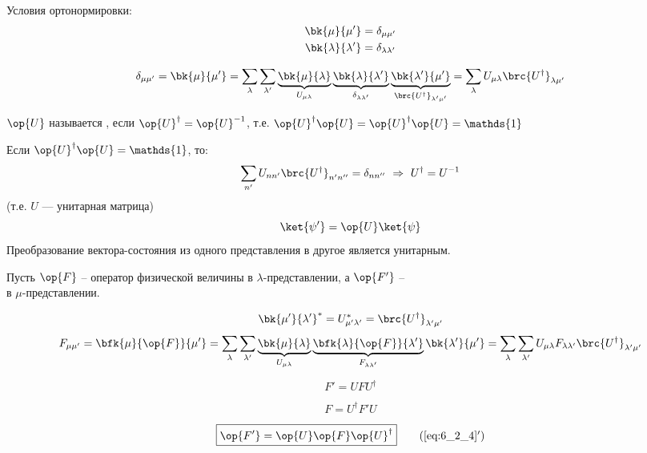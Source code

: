 Условия ортонормировки:
$$
\begin{gathered}
\bk{\mu}{\mu'}=\delta_{\mu\mu'}\\
\bk{\lambda}{\lambda'}=\delta_{\lambda\lambda'}
\end{gathered}
$$

$$
\delta_{\mu\mu'} = 
\bk{\mu}{\mu'} =
\sum_\lambda \sum_{\lambda'} \underbrace{\bk{\mu}{\lambda}}_{U_{\mu\lambda}}
\underbrace{\bk{\lambda}{\lambda'}}_{\delta_{\lambda\lambda'}}
\underbrace{\bk{\lambda'}{\mu'}}_{\brc{U^\dag}_{\lambda'\mu'}} =
\sum_\lambda U_{\mu\lambda}\brc{U^\dag}_{\lambda\mu'}
$$

\begin{defn}
$\op{U}$ называется , если $\op{U}^\dag = \op{U}^{-1}$, т.е. $\op{U}^\dag\op{U}=\op{U}^\dag\op{U}=\mathds{1}$
\end{defn}

Если $\op{U}^\dag\op{U}=\mathds{1}$, то:
$$
\sum_{n'}U_{nn'} \brc{U^\dag}_{n'n''}=\delta_{nn''}~ \Rightarrow~ U^\dag=U^{-1} 
$$
(т.е. $U$ --- унитарная матрица)
\begin{equation}
\label{eq:6_2_2}
\ket{\psi'}=\op{U}\ket{\psi}
\end{equation}
Преобразование вектора-состояния из одного представления в другое является унитарным. 

Пусть $\op{F}$ -- оператор физической величины в $\lambda$-представлении, а $\op{F'}$ --\\
в $\mu$-представлении.

$$
\bk{\mu'}{\lambda'}^*=U^*_{\mu'\lambda'}=\brc{U^\dag}_{\lambda'\mu'}
$$
\begin{equation}
\label{eq:6_2_3}
F_{\mu\mu'} = 
\bfk{\mu}{\op{F}}{\mu'} =
\sum_\lambda \sum_{\lambda'} 
\underbrace{\bk{\mu}{\lambda}}_{U_{\mu\lambda}}
\underbrace{\bfk{\lambda}{\op{F}}{\lambda'}}_{F_{\lambda\lambda'}}
\bk{\lambda'}{\mu'} =
\sum_\lambda \sum_{\lambda'} U_{\mu\lambda} F_{\lambda\lambda'} \brc{U^\dag}_{\lambda'\mu'}
\end{equation}

\begin{equation}
\label{eq:6_2_4}
\boxed{F'=U F U^\dag}
\end{equation}

\begin{equation}
\label{eq:6_2_5}
\boxed{F=U^\dag F' U}
\end{equation}

\begin{equation}
\label{eq:6_2_4_add}
\boxed{\op{F'}=\op{U} \op{F} \op{U}^\dag}
\tag{\ref{eq:6_2_4}$'$}
\end{equation}

